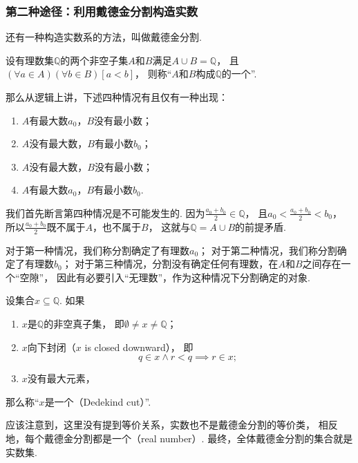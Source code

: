 \subsubsection*{第二种途径：利用戴德金分割构造实数}
还有一种构造实数系的方法，叫做戴德金分割.

\begin{definition}
设有理数集\(\mathbb{Q}\)的两个非空子集\(A\)和\(B\)满足\(A \cup B = \mathbb{Q}\)，
且\((\forall a\in A)(\forall b\in B)[a<b]\)，
则称“\(A\)和\(B\)构成\(\mathbb{Q}\)的一个”.
\end{definition}

那么从逻辑上讲，下述四种情况有且仅有一种出现：
\begin{enumerate}
	\item \(A\)有最大数\(a_0\)，\(B\)没有最小数；
	\item \(A\)没有最大数，\(B\)有最小数\(b_0\)；
	\item \(A\)没有最大数，\(B\)没有最小数；
	\item \(A\)有最大数\(a_0\)，\(B\)有最小数\(b_0\).
\end{enumerate}
我们首先断言第四种情况是不可能发生的.
因为\(\frac{a_0+b_0}2\in\mathbb{Q}\)，
且\(a_0 < \frac{a_0+b_0}2 < b_0\)，
所以\(\frac{a_0+b_0}2\)既不属于\(A\)，也不属于\(B\)，
这就与\(\mathbb{Q}=A \cup B\)的前提矛盾.

对于第一种情况，我们称分割确定了有理数\(a_0\)；
对于第二种情况，我们称分割确定了有理数\(b_0\)；
对于第三种情况，分割没有确定任何有理数，在\(A\)和\(B\)之间存在一个“空隙”，
因此有必要引入“无理数”，作为这种情况下分割确定的对象.

\begin{definition}
设集合\(x \subseteq \mathbb{Q}\).
如果\begin{enumerate}
	\item \(x\)是\(\mathbb{Q}\)的非空真子集，
	即\(\emptyset \neq x \neq \mathbb{Q}\)；

	\item \(x\)向下封闭（\(x\) is closed downward），
	即\[
		q \in x \land r < q \implies r \in x;
	\]

	\item \(x\)没有最大元素，
\end{enumerate}
那么称“\(x\)是一个（Dedekind cut）”.
\end{definition}

应该注意到，这里没有提到等价关系，实数也不是戴德金分割的等价类，
相反地，每个戴德金分割都是一个（real number）.
最终，全体戴德金分割的集合就是实数集.

